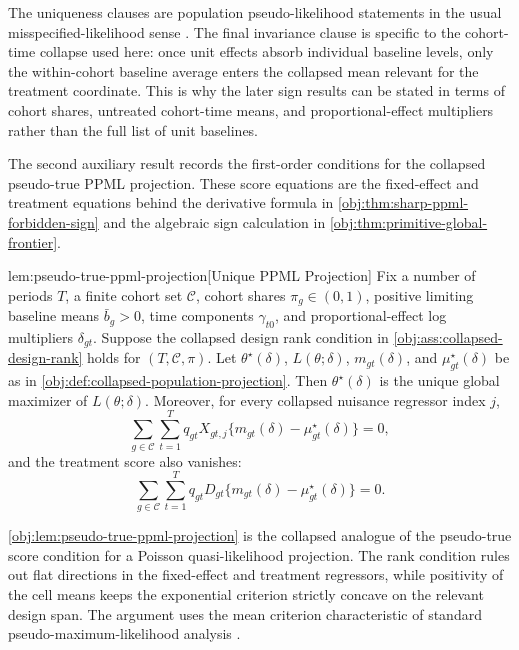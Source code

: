 The uniqueness clauses are population pseudo-likelihood statements in the usual misspecified-likelihood sense \citep{White1982MisspecifiedML,GourierouxMonfortTrognon1984Theory,GourierouxMonfortTrognon1984Poisson}. The final invariance clause is specific to the cohort-time collapse used here: once unit effects absorb individual baseline levels, only the within-cohort baseline average enters the collapsed mean relevant for the treatment coordinate. This is why the later sign results can be stated in terms of cohort shares, untreated cohort-time means, and proportional-effect multipliers rather than the full list of unit baselines.

The second auxiliary result records the first-order conditions for the collapsed pseudo-true PPML projection. These score equations are the fixed-effect and treatment equations behind the derivative formula in \cref{obj:thm:sharp-ppml-forbidden-sign} and the algebraic sign calculation in \cref{obj:thm:primitive-global-frontier}.

\begin{lemmav}{lem:pseudo-true-ppml-projection}[Unique PPML Projection]
Fix a number of periods \(T\), a finite cohort set \(\mathcal C\), cohort shares \(\pi_g\in(0,1)\), positive limiting baseline means \(\bar b_g>0\), time components \(\gamma_{t0}\), and proportional-effect log multipliers \(\delta_{gt}\). Suppose the collapsed design rank condition in \cref{obj:ass:collapsed-design-rank} holds for \((T,\mathcal C,\pi)\). Let \(\theta^\star(\delta)\), \(L(\theta;\delta)\), \(m_{gt}(\delta)\), and \(\mu^\star_{gt}(\delta)\) be as in \cref{obj:def:collapsed-population-projection}. Then \(\theta^\star(\delta)\) is the unique global maximizer of \(L(\theta;\delta)\). Moreover, for every collapsed nuisance regressor index \(j\),
\[
\sum_{g\in\mathcal C}\sum_{t=1}^T
q_{gt} X_{gt,j}\{m_{gt}(\delta)-\mu^\star_{gt}(\delta)\}=0,
\]
and the treatment score also vanishes:
\[
\sum_{g\in\mathcal C}\sum_{t=1}^T
q_{gt} D_{gt}\{m_{gt}(\delta)-\mu^\star_{gt}(\delta)\}=0.
\]
\end{lemmav}

\cref{obj:lem:pseudo-true-ppml-projection} is the collapsed analogue of the pseudo-true score condition for a Poisson quasi-likelihood projection. The rank condition rules out flat directions in the fixed-effect and treatment regressors, while positivity of the cell means keeps the exponential criterion strictly concave on the relevant design span. The argument uses the mean criterion characteristic of standard pseudo-maximum-likelihood analysis \citep{White1982MisspecifiedML,GourierouxMonfortTrognon1984Poisson}.

